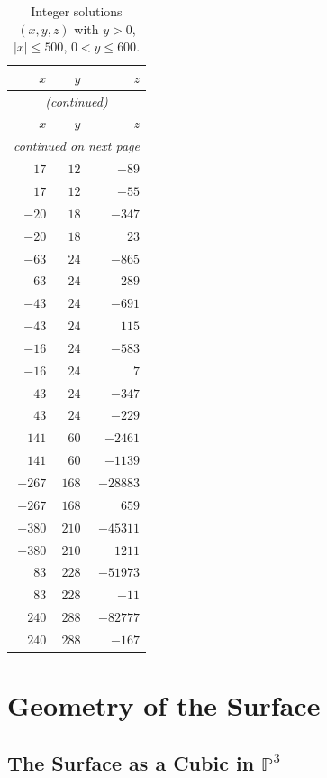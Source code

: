 \documentclass[12pt,a4paper]{article}
\theoremstyle{definition}
\newcommand{\Pbb}{\mathbb{P}}
\begin{document}
\begin{longtable}{rrr}
\caption{Integer solutions $(x,y,z)$ with $y>0$, $|x|\le500$, $0<y\le600$.}
\label{tab:yne0}\\
\toprule
$x$ & $y$ & $z$ \\
\midrule
\endfirsthead
\multicolumn{3}{c}{\textit{(continued)}}\\
\toprule $x$ & $y$ & $z$ \\ \midrule
\endhead
\midrule\multicolumn{3}{r}{\textit{continued on next page}}\\
\endfoot
\bottomrule
\endlastfoot
$17$   & $12$  & $-89$    \\
$17$   & $12$  & $-55$    \\
$-20$  & $18$  & $-347$   \\
$-20$  & $18$  & $23$     \\
$-63$  & $24$  & $-865$   \\
$-63$  & $24$  & $289$    \\
$-43$  & $24$  & $-691$   \\
$-43$  & $24$  & $115$    \\
$-16$  & $24$  & $-583$   \\
$-16$  & $24$  & $7$      \\
$43$   & $24$  & $-347$   \\
$43$   & $24$  & $-229$   \\
$141$  & $60$  & $-2461$  \\
$141$  & $60$  & $-1139$  \\
$-267$ & $168$ & $-28883$ \\
$-267$ & $168$ & $659$    \\
$-380$ & $210$ & $-45311$ \\
$-380$ & $210$ & $1211$   \\
$83$   & $228$ & $-51973$ \\
$83$   & $228$ & $-11$    \\
$240$  & $288$ & $-82777$ \\
$240$  & $288$ & $-167$   \\
\end{longtable}

\section{Geometry of the Surface}
\label{sec:geometry}

\subsection{The Surface as a Cubic in \texorpdfstring{$\Pbb^3$}{P³}}
\end{document}
